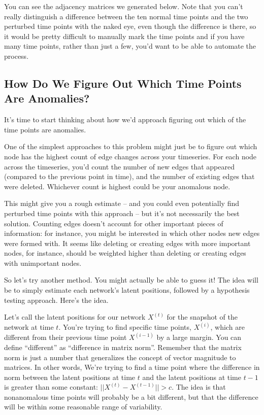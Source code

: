 \documentclass[letterpaper,10pt,english]{jupyterBook}
\begin{document}
\sphinxAtStartPar
You can see the adjacency matrices we generated below. Note that you can’t really distinguish a difference between the ten normal time points and the two perturbed time points with the naked eye, even though the difference is there, so it would be pretty difficult to manually mark the time points \sphinxhyphen{} and if you have many time points, rather than just a few, you’d want to be able to automate the process.

\noindent{}


\subsection{How Do We Figure Out Which Time Points Are Anomalies?}
\label{\detokenize{applications/ch10/anomaly-detection:how-do-we-figure-out-which-time-points-are-anomalies}}
\sphinxAtStartPar
It’s time to start thinking about how we’d approach figuring out which of the time points are anomalies.

\sphinxAtStartPar
One of the simplest approaches to this problem might just be to figure out which node has the highest count of edge changes across your timeseries. For each node across the timeseries, you’d count the number of new edges that appeared (compared to the previous point in time), and the number of existing edges that were deleted. Whichever count is highest could be your anomalous node.

\sphinxAtStartPar
This might give you a rough estimate – and you could even potentially find perturbed time points with this approach – but it’s not necessarily the best solution. Counting edges doesn’t account for other important pieces of information: for instance, you might be interested in which other nodes new edges were formed with. It seems like deleting or creating edges with more important nodes, for instance, should be weighted higher than deleting or creating edges with unimportant nodes.

\sphinxAtStartPar
So let’s try another method. You might actually be able to guess it! The idea will be to simply estimate each network’s latent positions, followed by a hypothesis testing approach. Here’s the idea.

\sphinxAtStartPar
Let’s call the latent positions for our network \(X^{(t)}\) for the snapshot of the network at time \(t\). You’re trying to find specific time points, \(X^{(i)}\), which are different from their previous time point \(X^{(i-1)}\) by a large margin. You can define “different” as “difference in matrix norm”. Remember that the matrix norm is just a number that generalizes the concept of vector magnitude to matrices. In other words, We’re trying to find a time point where the difference in norm between the latent positions at time \(t\) and the latent positions at time \(t-1\) is greater than some constant:  \(||X^{(t)} - X^{(t-1)}|| > c\). The idea is that non\sphinxhyphen{}anomalous time points will probably be a bit different, but that the difference will be within some reasonable range of variability.
\end{document}
